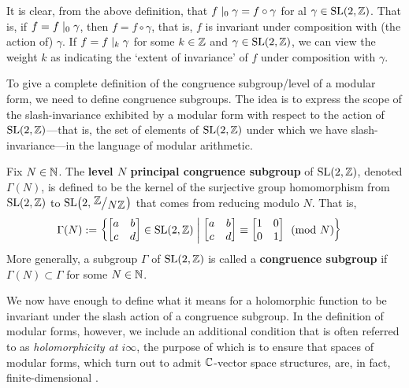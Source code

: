 It is clear, from the above definition, that $f \mid_0 \gamma = f \circ \gamma$ for al $\gamma \in \operatorname{SL}\!\left( 2, \mathbb{Z} \right)$. That is, if $f = f \mid_0 \gamma$, then $f = f \circ \gamma$, that is, $f$ is invariant under composition with (the action of) $\gamma$. If $f = f \mid_k \gamma$ for some $k \in \mathbb{Z}$ and $\gamma \in \operatorname{SL}\!\left( 2, \mathbb{Z} \right)$, we can view the weight $k$ as indicating the `extent of invariance' of $f$ under composition with $\gamma$.

To give a complete definition of the congruence subgroup/level of a modular form, we need to define congruence subgroups. The idea is to express the scope of the slash-invariance exhibited by a modular form with respect to the action of $\operatorname{SL}\!\left( 2, \mathbb{Z} \right)$---that is, the set of elements of $\operatorname{SL}\!\left( 2, \mathbb{Z} \right)$ under which we have slash-invariance---in the language of modular arithmetic.

\begin{boxdefinition}\label{Ch2:Def:Cong_Subgroup}
    Fix $N \in \mathbb{N}$. The \textbf{level $N$ principal congruence subgroup} of $\operatorname{SL}\!\left( 2, \mathbb{Z} \right)$, denoted $\Gamma(N)$, is defined to be the kernel of the surjective group homomorphism from $\operatorname{SL}\!\left( 2, \mathbb{Z} \right)$ to $\SL{2, \Zmod{N}}$ that comes from reducing modulo $N$. That is,
    \begin{align}
        \Gamma(N) &:= \left\{ 
        \begin{bmatrix}
            a & b \\ c & d
        \end{bmatrix} \in \operatorname{SL}\!\left( 2, \mathbb{Z} \right) \; \middle\vert \; 
        \begin{bmatrix}
            a & b \\ c & d
        \end{bmatrix}
        \equiv
        \begin{bmatrix}
            1 & 0 \\ 0 & 1
        \end{bmatrix}
        \pmod{N} \right\}
        \label{Ch2:Eq:PrincipalCongruenceSubgroup_def}
    \end{align}
    More generally, a subgroup $\Gamma$ of $\operatorname{SL}\!\left( 2, \mathbb{Z} \right)$ is called a \textbf{congruence subgroup} if $\Gamma(N) \subset \Gamma$ for some $N \in \mathbb{N}$.
\end{boxdefinition}

We now have enough to define what it means for a holomorphic function to be invariant under the slash action of a congruence subgroup. In the definition of modular forms, however, we include an additional condition that is often referred to as \textit{holomorphicity at $i\infty$}, the purpose of which is to ensure that spaces of modular forms, which turn out to admit $\mathbb{C}$-vector space structures, are, in fact, finite-dimensional \cite{KevinFamilies}.

